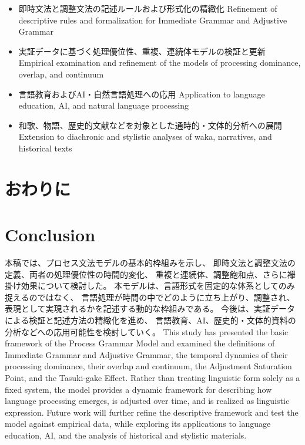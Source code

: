 \documentclass[a4paper]{article}
\begin{document}
\begin{itemize}
  \item
\ifJPN
即時文法と調整文法の記述ルールおよび形式化の精緻化
\else
Refinement of descriptive rules and formalization for Immediate Grammar and Adjustive Grammar
\fi

  \item
\ifJPN
実証データに基づく処理優位性、重複、連続体モデルの検証と更新
\else
Empirical examination and refinement of the models of processing dominance, overlap, and continuum
\fi

  \item
\ifJPN
言語教育およびAI・自然言語処理への応用
\else
Application to language education, AI, and natural language processing
\fi

  \item
\ifJPN
和歌、物語、歴史的文献などを対象とした通時的・文体的分析への展開
\else
Extension to diachronic and stylistic analyses of waka, narratives, and historical texts
\fi
\end{itemize}



\ifJPN
  \section{おわりに}
\else
  \section{Conclusion}
\fi

\ifJPN
本稿では、プロセス文法モデルの基本的枠組みを示し、
即時文法と調整文法の定義、両者の処理優位性の時間的変化、
重複と連続体、調整飽和点、さらに襷掛け効果について検討した。
本モデルは、言語形式を固定的な体系としてのみ捉えるのではなく、
言語処理が時間の中でどのように立ち上がり、調整され、
表現として実現されるかを記述する動的な枠組みである。
今後は、実証データによる検証と記述方法の精緻化を進め、
言語教育、AI、歴史的・文体的資料の分析などへの応用可能性を検討していく。
\else
This study has presented the basic framework of the Process Grammar Model
and examined the definitions of Immediate Grammar and Adjustive Grammar,
the temporal dynamics of their processing dominance,
their overlap and continuum, the Adjustment Saturation Point,
and the Tasuki-gake Effect.
Rather than treating linguistic form solely as a fixed system,
the model provides a dynamic framework for describing how language processing
emerges, is adjusted over time, and is realized as linguistic expression.
Future work will further refine the descriptive framework and test the model
against empirical data, while exploring its applications to language education,
AI, and the analysis of historical and stylistic materials.
\fi
\appendix




\printbibliography
\end{document}
